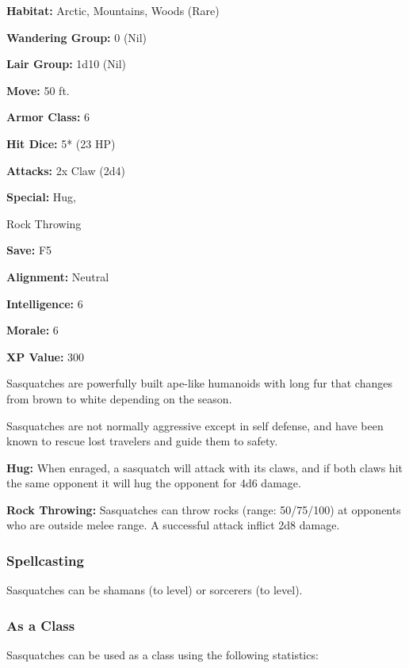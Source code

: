 \begin{multicols*}{2}
{{\textbf{Habitat:} Arctic, Mountains, Woods (Rare)

\textbf{Wandering Group:} 0 (Nil)

\textbf{Lair Group:} 1d10 (Nil)

\textbf{Move:} 50 ft.

\textbf{Armor Class:} 6

\textbf{Hit Dice:} 5* (23 HP)

\textbf{Attacks:} 2x Claw (2d4)

\textbf{Special:} Hug, 

Rock Throwing

\textbf{Save:} F5

\textbf{Alignment:} Neutral

\textbf{Intelligence:} 6

\textbf{Morale:} 6

\textbf{XP Value:} 300}}

Sasquatches are powerfully built ape-like humanoids with long fur that changes from brown to white depending on the season.

Sasquatches are not normally aggressive except in self defense, and have been known to rescue lost travelers and guide them to safety.

\textbf{Hug:} When enraged, a sasquatch will attack with its claws, and if both claws hit the same opponent it will hug the opponent for 4d6 damage.

\textbf{Rock Throwing:} Sasquatches can throw rocks (range: 50/75/100) at opponents who are outside melee range. A successful attack inflict 2d8 damage.

\subsubsection{Spellcasting}
Sasquatches can be shamans (to  level) or sorcerers (to  level).

\subsubsection{As a Class}
Sasquatches can be used as a class using the following statistics:

\end{multicols*}
